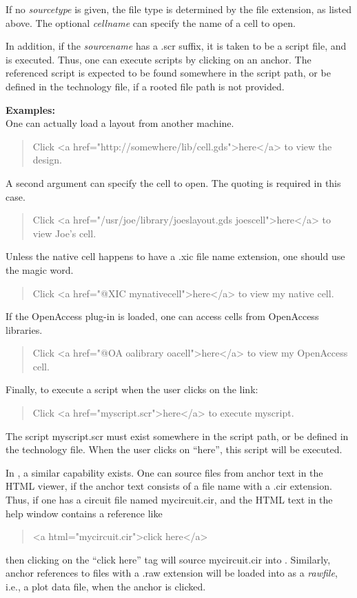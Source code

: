 If no {\it sourcetype} is given, the file type is determined by the
file extension, as listed above.  The optional {\it cellname} can
specify the name of a cell to open.

In addition, if the {\it sourcename} has a {\vt .scr} suffix, it is
taken to be a script file, and is executed.  Thus, one can execute
{\Xic} scripts by clicking on an anchor.  The referenced script is
expected to be found somewhere in the script path, or be defined in
the technology file, if a rooted file path is not provided.

{\bf Examples:}\\
One can actually load a layout from another machine.
\begin{quote}\vt
Click <a href="http://somewhere/lib/cell.gds">here</a> to view the
design.
\end{quote}

A second argument can specify the cell to open.  The quoting is
required in this case.
\begin{quote}\vt
Click <a href="/usr/joe/library/joeslayout.gds joescell">here</a> to
view Joe's cell.
\end{quote}

Unless the native cell happens to have a {\vt .xic} file name
extension, one should use the magic word.
\begin{quote}\vt
Click <a href="@XIC mynativecell">here</a> to view my native cell.
\end{quote}

If the OpenAccess plug-in is loaded, one can access cells from
OpenAccess libraries.
\begin{quote}\vt
Click <a href="@OA oalibrary oacell">here</a> to view my OpenAccess
cell.
\end{quote}

Finally, to execute a script when the user clicks on the link:
\begin{quote}\vt
Click <a href="myscript.scr">here</a> to execute myscript.
\end{quote}
The script {\vt myscript.scr} must exist somewhere in the script path,
or be defined in the technology file.  When the user clicks on
``here'', this script will be executed.

In {\WRspice}, a similar capability exists.  One can source files from
anchor text in the HTML viewer, if the anchor text consists of a file
name with a {\vt .cir} extension.  Thus, if one has a circuit file
named {\vt mycircuit.cir}, and the HTML text in the help window
contains a reference like
\begin{quote}\vt
<a html="mycircuit.cir">click here</a>
\end{quote}
then clicking on the ``click here'' tag will source {\vt
mycircuit.cir} into {\WRspice}.  Similarly, anchor references to files
with a {\vt .raw} extension will be loaded into {\WRspice} as a
{\it rawfile\/}, i.e., a plot data file, when the anchor is clicked.

